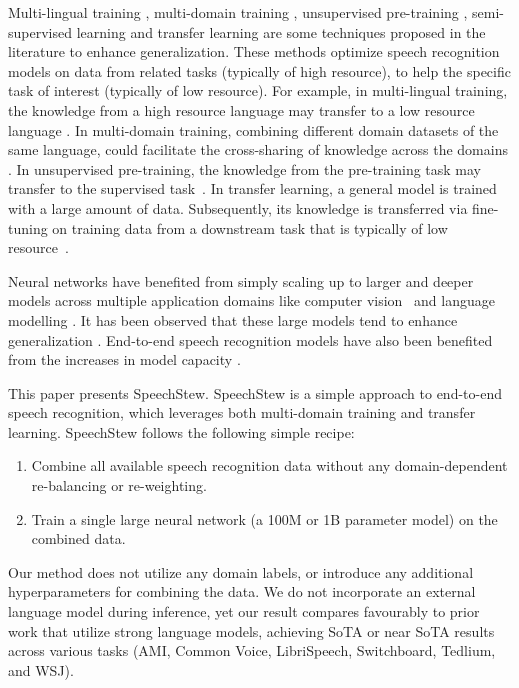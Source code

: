 \documentclass[a4paper]{article}
\begin{document}
Multi-lingual training \cite{burget-icassp-2010,heigold-icassp-2013}, multi-domain training \cite{kaldi-multi-en,narayanan-slt-2018}, unsupervised pre-training \cite{devlin-naacl-2019,baevski-arxiv-2020}, semi-supervised learning \cite{synnaeve-icml-2020,park-interspeech-2020} and transfer learning \cite{donahue-icml-2014,kornblith-cvpr-2019} are some techniques proposed in the literature to enhance generalization. These methods optimize speech recognition models on data from related tasks (typically of high resource), to help the specific task of interest (typically of low resource). For example, in multi-lingual training, the knowledge from a high resource language may transfer to a low resource language \cite{li-icassp-2019}. In multi-domain training, combining different domain datasets of the same language, could facilitate the cross-sharing of knowledge across the domains \cite{narayanan-slt-2018}. In unsupervised pre-training, the knowledge from the pre-training task may transfer to the supervised task~\cite{schneider-arxiv-2019}. In transfer learning, a general model is trained with a large amount of data. Subsequently, its knowledge is transferred via fine-tuning on training data from a downstream task that is typically of low resource~\cite{kolesnikov-arxiv-2019}.

Neural networks have benefited from simply scaling up to larger and deeper models across multiple application domains like computer vision~\cite{krizhevsky-nips-2012,he-cvpr-2016} and language modelling \cite{vaswani-nips-2017,brown-neurips-2020}. It has been observed that these large models tend to enhance generalization \cite{nakkiran-iclr-2020}. End-to-end speech recognition models have also been benefited from the increases in model capacity \cite{zhang-icassp-2017,gulati-interspeech-2020,zhang-arxiv-2020}.

This paper presents SpeechStew. SpeechStew is a simple approach to end-to-end speech recognition, which leverages both multi-domain training and transfer learning. 
SpeechStew follows the following simple recipe:
\begin{enumerate}[noitemsep]    
    \item Combine all available speech recognition data without any domain-dependent re-balancing or re-weighting.
    \item Train a single large neural network (a 100M or 1B parameter model) on the combined data.
\end{enumerate}
Our method does not utilize any domain labels, or introduce any additional hyperparameters for combining the data. We do not incorporate an external language model during inference, yet our result compares favourably to prior work that utilize strong language models, achieving SoTA or near SoTA results across various tasks (AMI, Common Voice, LibriSpeech, Switchboard, Tedlium, and WSJ).
\end{document}
